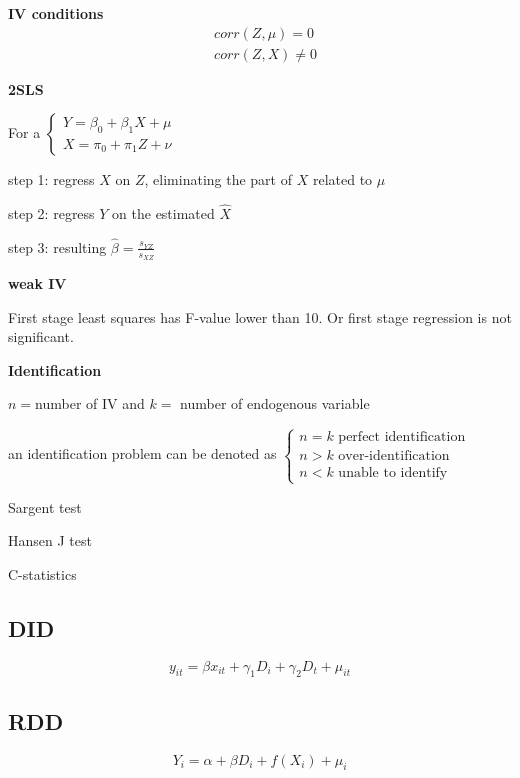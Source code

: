 \documentclass{article}
\begin{document}
\textbf{IV conditions}
\begin{align}
  &corr(Z,\mu)=0
  \\&corr(Z,X)\neq 0
\end{align}

\textbf{2SLS}

For a 
$\begin{cases}
Y=\beta_0+\beta_1X+\mu\\
X=\pi_0+\pi_1 Z+\nu
\end{cases}$

step 1: regress $X$ on $Z$, eliminating the part of $X$ related to $\mu$

step 2: regress $Y$ on the estimated $\hat X$

step 3: resulting $\hat{\beta}=\frac{s_{YZ}}{s_{XZ}}$


\textbf{weak IV}

First stage least squares has F-value lower than 10. Or first stage regression is not significant.



\textbf{Identification}

$n=$number of IV and $k=$ number of endogenous variable

an identification problem can be denoted as 
$\begin{cases}
  n=k \text{ perfect identification}
  \\
  n>k \text{ over-identification}
  \\
  n<k \text{ unable to identify}
\end{cases}$

Sargent test

Hansen J test

C-statistics

\subsection{DID}

\begin{equation}
  y_{it}=\beta x_{it} + \gamma_1 D_i +\gamma_2 D_t + \mu_{it}
\end{equation}


\subsection{RDD}
\begin{equation}
  Y_i = \alpha + \beta D_i + f(X_i) + \mu_i 
\end{equation}
\end{document}
